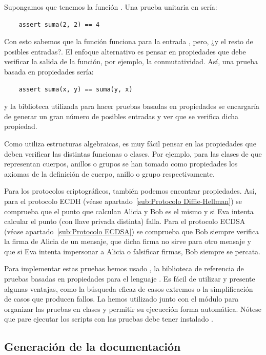 \begin{ejemplo}
    Supongamos que tenemos la función . Una prueba unitaria en  sería:
    \begin{verbatim}    assert suma(2, 2) == 4\end{verbatim}
    Con esto sabemos que la función  funciona para la entrada , pero, ¿y el resto de posibles entradas?. El enfoque alternativo es pensar en propiedades que debe verificar la salida de la función, por ejemplo, la conmutatividad. Así, una prueba basada en propiedades sería:
    \begin{verbatim}    assert suma(x, y) == suma(y, x)\end{verbatim}
    y la biblioteca utilizada para hacer pruebas basadas en propiedades se encargaría de generar un gran número de posibles entradas y ver que se verifica dicha propiedad.
\end{ejemplo}

Como  utiliza estructuras algebraicas, es muy fácil pensar en las propiedades que deben verificar las distintas funcionas o clases. Por ejemplo, para las clases de  que representan cuerpos, anillos o grupos se han tomado como propiedades los axiomas de la definición de cuerpo, anillo o grupo respectivamente.

Para los protocolos criptográficos, también podemos encontrar propiedades. Así, para el protocolo ECDH (véase apartado~\ref{sub:Protocolo Diffie-Hellman}) se comprueba que el punto que calculan Alicia y Bob es el mismo y si Eva intenta calcular el punto (con llave privada distinta) falla. Para el protocolo ECDSA (véase apartado~\ref{sub:Protocolo ECDSA}) se comprueba que Bob siempre verifica la firma de Alicia de un mensaje, que dicha firma no sirve para otro mensaje y que si Eva intenta impersonar a Alicia o falsificar firmas, Bob siempre se percata.

Para implementar estas pruebas hemos usado , la biblioteca de referencia de pruebas basadas en propiedades para el lenguaje . Es fácil de utilizar y presente algunas ventajas, como la búsqueda eficaz de casos extremos o la simplificación de casos que producen fallos. La hemos utilizado junto con el módulo  para organizar las pruebas en clases y permitir su ejecucción forma automática. Nótese que pare ejecutar los scripts con las pruebas debe tener instalado .

\subsection{Generación de la documentación}
\label{sub:Generación de la documentación}

